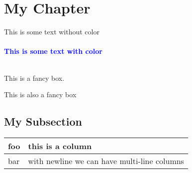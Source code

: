 \section{My Chapter} %
This is some text without color\\\\
\textcolor{blue}{\textbf{This is some text with color}}\\\\
%
%
%
%
\begin{tcolorbox}[width=\columnwidth, enhanced, sharp corners, title=box title, colframe=myorange]
This is a fancy box.
\end{tcolorbox}
%
%
\newcommand{\mybox}[1] { %
	\begin{tcolorbox}[width=\columnwidth, enhanced, sharp corners, title=box title, colframe=myorange]
		#1 
	\end{tcolorbox}
}
%
\mybox{This is also a fancy box}
%
%
\subsection{My Subsection}
%
\begin{tabular}{| p{} | p{} |}
	\hline
	foo     & this is a column          \\ \hline
	bar     & with newline \newline we can have multi-line columns \\ \hline
\end{tabular}
%
%
%
% 